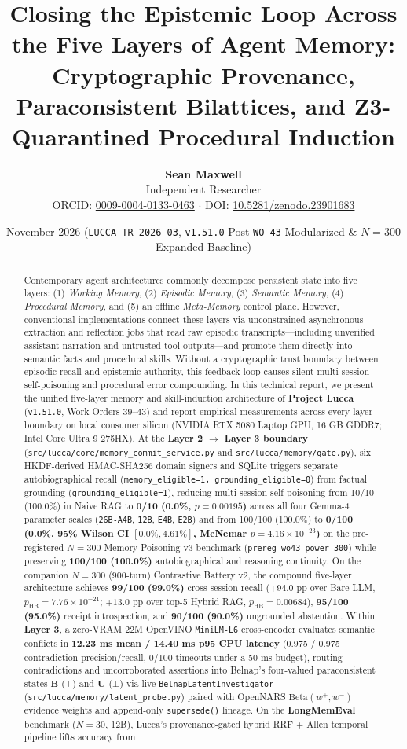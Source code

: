 \documentclass[11pt,a4paper]{article}
\title{\textbf{Closing the Epistemic Loop Across the Five Layers of Agent Memory: Cryptographic Provenance, Paraconsistent Bilattices, and Z3-Quarantined Procedural Induction}}
\author{
  \textbf{Sean Maxwell} \\
  Independent Researcher \\
  ORCID: \href{https://orcid.org/0009-0004-0133-0463}{0009-0004-0133-0463} $\cdot$ DOI: \href{https://doi.org/10.5281/zenodo.23901683}{10.5281/zenodo.23901683}
}
\date{November 2026 (\texttt{LUCCA-TR-2026-03}, \texttt{v1.51.0} Post-\texttt{WO-43} Modularized \& $N=300$ Expanded Baseline)}
\begin{document}
\maketitle

\begin{abstract}
Contemporary agent architectures commonly decompose persistent state into five layers: (1) \emph{Working Memory}, (2) \emph{Episodic Memory}, (3) \emph{Semantic Memory}, (4) \emph{Procedural Memory}, and (5) an offline \emph{Meta-Memory} control plane. However, conventional implementations connect these layers via unconstrained asynchronous extraction and reflection jobs that read raw episodic transcripts---including unverified assistant narration and untrusted tool outputs---and promote them directly into semantic facts and procedural skills. Without a cryptographic trust boundary between episodic recall and epistemic authority, this feedback loop causes silent multi-session self-poisoning and procedural error compounding. In this technical report, we present the unified five-layer memory and skill-induction architecture of \textbf{Project Lucca} (\texttt{v1.51.0}, Work Orders 39--43) and report empirical measurements across every layer boundary on local consumer silicon (NVIDIA RTX 5080 Laptop GPU, 16 GB GDDR7; Intel Core Ultra 9 275HX). At the \textbf{Layer 2 $\to$ Layer 3 boundary} (\texttt{src/lucca/core/memory\_commit\_service.py} and \texttt{src/lucca/memory/gate.py}), six HKDF-derived HMAC-SHA256 domain signers and SQLite triggers separate autobiographical recall (\texttt{memory\_eligible=1, grounding\_eligible=0}) from factual grounding (\texttt{grounding\_eligible=1}), reducing multi-session self-poisoning from 10/10 (100.0\%) in Naive RAG to \textbf{0/10 (0.0\%, $p = 0.00195$)} across all four Gemma-4 parameter scales (\texttt{26B-A4B}, \texttt{12B}, \texttt{E4B}, \texttt{E2B}) and from 100/100 (100.0\%) to \textbf{0/100 (0.0\%, 95\% Wilson CI $[0.0\%, 4.61\%]$, McNemar $p = 4.16 \times 10^{-23}$)} on the pre-registered $N=300$ Memory Poisoning v3 benchmark (\texttt{prereg-wo43-power-300}) while preserving \textbf{100/100 (100.0\%)} autobiographical and reasoning continuity. On the companion $N=300$ ($900$-turn) Contrastive Battery v2, the compound five-layer architecture achieves \textbf{99/100 (99.0\%)} cross-session recall ($+94.0\text{ pp}$ over Bare LLM, $p_{\text{HB}} = 7.76 \times 10^{-21}$; $+13.0\text{ pp}$ over top-5 Hybrid RAG, $p_{\text{HB}} = 0.00684$), \textbf{95/100 (95.0\%)} receipt introspection, and \textbf{90/100 (90.0\%)} ungrounded abstention. Within \textbf{Layer 3}, a zero-VRAM 22M OpenVINO \texttt{MiniLM-L6} cross-encoder evaluates semantic conflicts in \textbf{12.23 ms mean / 14.40 ms p95 CPU latency} (0.975 / 0.975 contradiction precision/recall, 0/100 timeouts under a 50 ms budget), routing contradictions and uncorroborated assertions into Belnap's four-valued paraconsistent states $\mathbf{B}$ ($\top$) and $\mathbf{U}$ ($\bot$) via live \texttt{BelnapLatentInvestigator} (\texttt{src/lucca/memory/latent\_probe.py}) paired with OpenNARS $\text{Beta}(w^+, w^-)$ evidence weights and append-only \texttt{supersede()} lineage. On the \textbf{LongMemEval} benchmark ($N=30$, 12B), Lucca's provenance-gated hybrid RRF + Allen temporal pipeline lifts accuracy from 
\end{abstract}
\end{document}
